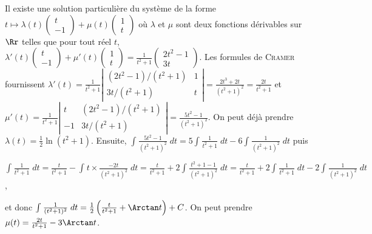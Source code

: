 {\begin{enumerate}
{Il existe une solution particulière du système de la forme $t\mapsto\lambda(t)\left(
\begin{array}{c}
t\\
-1
\end{array}
\right)
+\mu(t)\left(
\begin{array}{c}
1\\
t
\end{array}
\right)$ où $\lambda$ et $\mu$ sont deux fonctions dérivables sur $\Rr$ telles que pour tout réel $t$, $\lambda'(t)\left(
\begin{array}{c}
t\\
-1
\end{array}
\right)
+\mu'(t)\left(
\begin{array}{c}
1\\
t
\end{array}
\right)= \frac{1}{t^2+1}\left(
\begin{array}{c}
2t^2-1\\
3t
\end{array}
\right)$. Les formules de \textsc{Cramer} fournissent $\lambda'(t)= \frac{1}{t^2+1}\left|
\begin{array}{cc}
(2t^2-1)/(t^2+1)&1\\
3t/(t^2+1)&t
\end{array}
\right|= \frac{2t^3+2t}{(t^2+1)^2}= \frac{2t}{t^2+1}$ et $\mu'(t)= \frac{1}{t^2+1}\left|
\begin{array}{cc}
t&(2t^2-1)/(t^2+1)\\
-1&3t/(t^2+1)
\end{array}
\right|= \frac{5t^2-1}{(t^2+1)^2}$. On peut déjà prendre $\lambda(t)= \frac{1}{2}\ln(t^2+1)$. Ensuite, 
$\int_{}^{} \frac{5t^2-1}{(t^2+1)^2}\;dt=5\int_{}^{} \frac{1}{t^2+1}\;dt-6\int_{}^{} \frac{1}{(t^2+1)^2}\;dt$ puis

\begin{center}
$\int_{}^{} \frac{1}{t^2+1}\;dt= \frac{t}{t^2+1}-\int_{}^{}t\times \frac{-2t}{(t^2+1)^2}\;dt= \frac{t}{t^2+1}+2\int_{}^{} \frac{t^2+1-1}{(t^2+1)^2}\;dt= \frac{t}{t^2+1}+2\int_{}^{} \frac{1}{t^2+1}\;dt-2\int_{}^{} \frac{1}{(t^2+1)^2}\;dt$,
\end{center}

et donc $\int_{}^{} \frac{1}{(t^2+1)^2}\;dt= \frac{1}{2}\left( \frac{t}{t^2+1}+\Arctan t\right)+C$. On peut prendre $\mu(t)= \frac{2t}{t^2+1}-3\Arctan t$.

}
\end{enumerate}}
